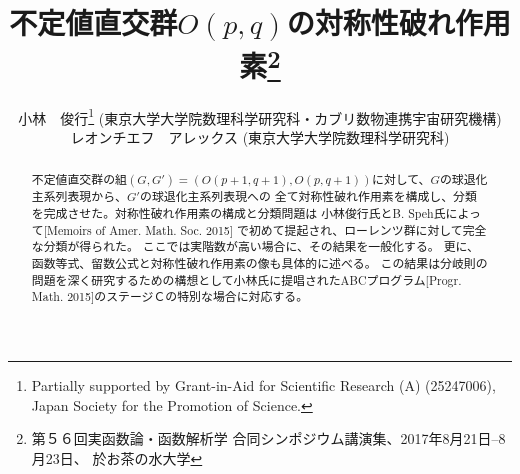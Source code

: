 \documentclass[12pt]{article} %
\theoremstyle{definition}
\theoremstyle{exampstyle} \newtheorem{examp}[theorem]{Theorem}
\begin{document}
\renewcommand{\abstractname}{概要}

\title{不定値直交群$O(p,q)$の対称性破れ作用素\thanks{第５６回実函数論・函数解析学 合同シンポジウム講演集、2017年8月21日--8月23日、
於\;お茶の水大学}}

\author{小林　俊行\thanks{Partially supported by Grant-in-Aid for Scientific
Research (A) (25247006), Japan Society for the Promotion of Science.} (東京大学\;大学院数理科学研究科{・}カブリ数物連携宇宙研究機構)\\
  レオンチエフ　アレックス (東京大学\;大学院数理科学研究科)}




  \maketitle
\begin{abstract}
	不定値直交群の組$(G, G') =(O(p+1, q+1), O(p,q+1))$に対して、$G$の球退化主系列表現から、$G'$の球退化主系列表現への
	全て対称性破れ作用素を構成し、分類
	を完成させた。対称性破れ作用素の構成と分類問題{は}
	小林俊行氏とB. Speh氏によって[Memoirs of Amer. Math. Soc. 2015]
	で初めて提起され、ローレンツ群に対して完全な分類が得られた。
	ここでは実階数が高い場合に、その結果を一般化する。
	更に、函数等式、留数公式と対称性破れ作用素の像も具体的に述べる。
	この結果は分岐則の問題を深く研究するための構想として小林氏に提唱されたABCプログラム[Progr. Math. 2015]のステージＣの特別な場合に対応する。
\end{abstract}
\end{document}
